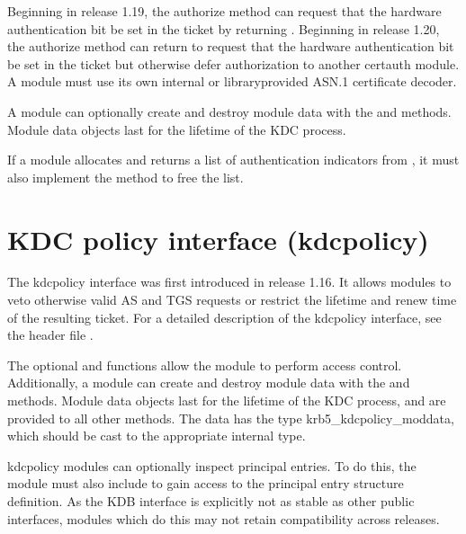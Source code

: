 \documentclass[letterpaper,10pt,english]{sphinxmanual}
\begin{document}
\sphinxAtStartPar
Beginning in release 1.19, the authorize method can request that the
hardware authentication bit be set in the ticket by returning
.  Beginning in release 1.20, the authorize
method can return  to request that the
hardware authentication bit be set in the ticket but otherwise defer
authorization to another certauth module.  A module must use its own
internal or library\sphinxhyphen{}provided ASN.1 certificate decoder.

\sphinxAtStartPar
A module can optionally create and destroy module data with the
 and  methods.  Module data objects last for the
lifetime of the KDC process.

\sphinxAtStartPar
If a module allocates and returns a list of authentication indicators
from , it must also implement the  method
to free the list.


\section{KDC policy interface (kdcpolicy)}
\label{\detokenize{plugindev/kdcpolicy:kdc-policy-interface-kdcpolicy}}\label{\detokenize{plugindev/kdcpolicy:kdcpolicy-plugin}}\label{\detokenize{plugindev/kdcpolicy::doc}}
\sphinxAtStartPar
The kdcpolicy interface was first introduced in release 1.16.  It
allows modules to veto otherwise valid AS and TGS requests or restrict
the lifetime and renew time of the resulting ticket.  For a detailed
description of the kdcpolicy interface, see the header file
.

\sphinxAtStartPar
The optional  and  functions allow the module
to perform access control.  Additionally, a module can create and
destroy module data with the  and  methods.  Module
data objects last for the lifetime of the KDC process, and are
provided to all other methods.  The data has the type
krb5\_kdcpolicy\_moddata, which should be cast to the appropriate
internal type.

\sphinxAtStartPar
kdcpolicy modules can optionally inspect principal entries.  To do
this, the module must also include  to gain access to the
principal entry structure definition.  As the KDB interface is
explicitly not as stable as other public interfaces, modules which do
this may not retain compatibility across releases.



\renewcommand{\indexname}{Index}
\printindex
\end{document}
